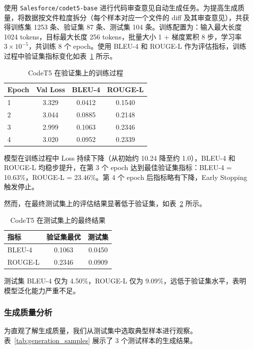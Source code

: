 \documentclass{experimentreport}
\begin{document}
{使用 \texttt{Salesforce/codet5-base} 进行代码审查意见自动生成任务。为提高生成质量，将数据按文件粒度拆分（每个样本对应一个文件的 diff 及其审查意见），共获得训练集 1253 条、验证集 87 条、测试集 104 条。训练配置为：输入最大长度 1024 tokens，目标最大长度 256 tokens，批量大小 1 + 梯度累积 8 步，学习率 $3\times10^{-5}$，共训练 8 个 epoch。使用 BLEU-4 和 ROUGE-L 作为评估指标，训练过程中验证集指标变化如表~\ref{tab:codet5_results} 所示。

\begin{table}[htbp]
\centering
\caption{CodeT5 在验证集上的训练过程}
\label{tab:codet5_results}
\begin{tabular}{lccc}
\hline
\textbf{Epoch} & \textbf{Val Loss} & \textbf{BLEU-4} & \textbf{ROUGE-L} \\
\hline
1 & 3.329 & 0.0412 & 0.1540 \\
2 & 3.044 & 0.0885 & 0.2148 \\
3 & 2.999 & 0.1063 & 0.2346 \\
4 & 3.020 & 0.0952 & 0.2339 \\
\hline
\end{tabular}
\end{table}

模型在训练过程中 Loss 持续下降（从初始约 10.24 降至约 1.0），BLEU-4 和 ROUGE-L 均稳步提升，在第 3 个 epoch 达到最佳验证集指标：BLEU-4 = 10.63\%，ROUGE-L = 23.46\%。第 4 个 epoch 后指标略有下降，Early Stopping 触发停止。

然而，在最终测试集上的评估结果显著低于验证集，如表~\ref{tab:codet5_test} 所示。

\begin{table}[htbp]
\centering
\caption{CodeT5 在测试集上的最终结果}
\label{tab:codet5_test}
\begin{tabular}{lcc}
\hline
\textbf{指标} & \textbf{验证集最优} & \textbf{测试集} \\
\hline
BLEU-4 & 0.1063 & 0.0450 \\
ROUGE-L & 0.2346 & 0.0909 \\
\hline
\end{tabular}
\end{table}

测试集 BLEU-4 仅为 4.50\%，ROUGE-L 仅为 9.09\%，远低于验证集水平，表明模型泛化能力严重不足。

\subsubsection*{生成质量分析}

为直观了解生成质量，我们从测试集中选取典型样本进行观察。表~\ref{tab:generation_samples} 展示了 3 个测试样本的生成结果。

}
\end{document}
